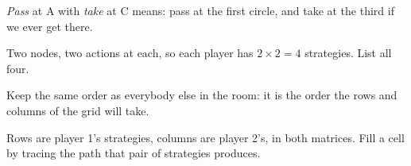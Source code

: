 \begin{center}
\centipede[0.82]{}
\end{center}

\vspace{0.3cm}

\begin{center}
\hspace{3.5cm}
\end{center}

\vspace{0.2cm}

{\large\color{inkgrey} \emph{Pass} at A with \emph{take} at C means: pass at the
first circle, and take at the third if we ever get there.}

\newpage
{}

\vspace{0.4cm}

{\Large Two nodes, two actions at each, so each player has
\(2 \times 2 = 4\) strategies. List all four.}

\vspace{0.5em}

{\large\color{inkgrey} Keep the same order as everybody else in the room: it is
the order the rows and columns of the grid will take.}

\vspace{0.7cm}

\begin{center}
\hspace{3.5cm}
\end{center}

\newpage
{}

\vspace{0.1cm}

{\Large Rows are player 1's strategies, columns are player 2's, in both
matrices. Fill a cell by tracing the path that pair of strategies produces.}

\vspace{0.25cm}

\begin{center}
\centipede[0.6]{}
\end{center}

\vspace{0.1cm}

